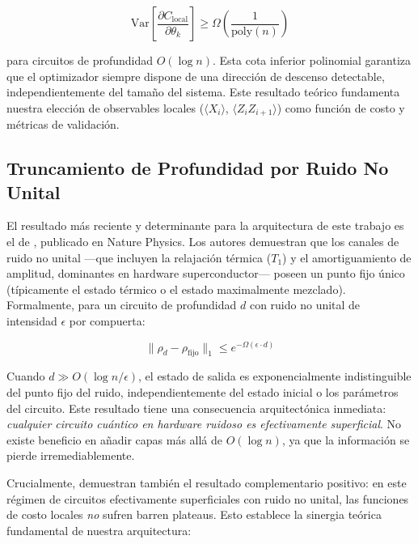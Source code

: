 \documentclass[11pt,a4paper,spanish]{book}
\begin{document}
\begin{equation}
\text{Var}\left[\frac{\partial C_{\text{local}}}{\partial \theta_k}\right] \geq \Omega\left(\frac{1}{\text{poly}(n)}\right)
\label{eq:local_bp}
\end{equation}

\noindent para circuitos de profundidad $O(\log n)$. Esta cota inferior polinomial garantiza que el optimizador siempre dispone de una dirección de descenso detectable, independientemente del tamaño del sistema. Este resultado teórico fundamenta nuestra elección de observables locales ($\langle X_i \rangle$, $\langle Z_i Z_{i+1} \rangle$) como función de costo y métricas de validación.

\subsection{Truncamiento de Profundidad por Ruido No Unital}

El resultado más reciente y determinante para la arquitectura de este trabajo es el de \citet{mele2026}, publicado en Nature Physics. Los autores demuestran que los canales de ruido no unital ---que incluyen la relajación térmica ($T_1$) y el amortiguamiento de amplitud, dominantes en hardware superconductor--- poseen un punto fijo único (típicamente el estado térmico o el estado maximalmente mezclado). Formalmente, para un circuito de profundidad $d$ con ruido no unital de intensidad $\epsilon$ por compuerta:

\begin{equation}
\|\rho_d - \rho_{\text{fijo}}\|_1 \leq e^{-\Omega(\epsilon \cdot d)}
\label{eq:truncation}
\end{equation}

Cuando $d \gg O(\log n / \epsilon)$, el estado de salida es exponencialmente indistinguible del punto fijo del ruido, independientemente del estado inicial o los parámetros del circuito. Este resultado tiene una consecuencia arquitectónica inmediata: \emph{cualquier circuito cuántico en hardware ruidoso es efectivamente superficial}. No existe beneficio en añadir capas más allá de $O(\log n)$, ya que la información se pierde irremediablemente.

Crucialmente, \citet{mele2026} demuestran también el resultado complementario positivo: en este régimen de circuitos efectivamente superficiales con ruido no unital, las funciones de costo locales \emph{no} sufren barren plateaus. Esto establece la sinergia teórica fundamental de nuestra arquitectura:
\end{document}
